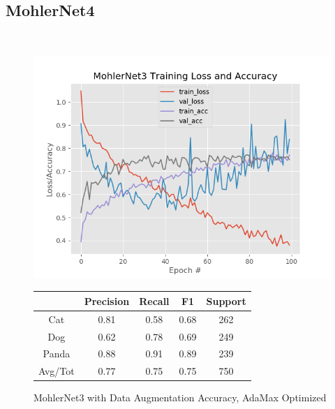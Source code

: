 \documentclass[12pt]{article}
\begin{document}
\subsection{MohlerNet4}

\begin{center}
	 \\
\end{center}


\begin{figure}[h]
	\centering %
	\captionsetup{justification=centering}
	\begin{minipage}{0.5\textwidth}
		\centering %
		\includegraphics[width=1\textwidth]{MohlerNet3_opt-AdamaxAugmented_KEEP.png}
		\caption{MohlerNet3 with Data Augmentation Accuracy, AdaMax Optimized} \label{MN3Aug}
	\end{minipage}\hfill
	\begin{minipage}{0.5\textwidth}
		\begin{center}
			\begin{tabular}[5pt]{| c| c| c| c|c|}
				\hline
				& Precision & Recall & F1 & Support \\[0.5ex] 
				\hline 	
				Cat   &    0.81&      0.58 &     0.68  &     262\\ \hline 
				Dog    &   0.62 &     0.78 &     0.69 &      249    \\ \hline 
				Panda   &   0.88&      0.91  &    0.89  &     239   \\ \hline 
				Avg/Tot  &    0.77 &     0.75   &   0.75   &    750\\ \hline 
				
			\end{tabular}
			\label{MN3RAug}
		\end{center}	
	\end{minipage}
\end{figure}
\end{document}
